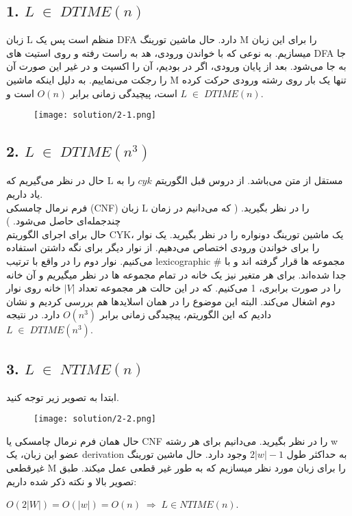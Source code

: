 \subsection*{1. $L \;\in\; DTIME(n)$}
زبان L منظم است پس یک DFA دارد.
حال ماشین تورینگ M را برای این زبان میسازیم.
به نوعی که با خواندن ورودی،
هد به راست رفته و روی استیت های DFA جا به جا می‌شود.
بعد از پایان ورودی، اگر در
بودیم، آن را اکسپت و در غیر این صورت آن را رجکت می‌نماییم.
به دلیل اینکه ماشین M تنها یک بار روی رشته ورودی حرکت کرده است، پیچیدگی زمانی برابر 
$O(n)$ است و 
$L\;\in\;DTIME(n)$.

\begin{figure}[H]
    \centering
    \texttt{[image: solution/2-1.png]}
\end{figure}

\subsection*{2. $L \;\in\; DTIME(n^3)$}
حال در نظر می‌گیریم که L مستقل از متن می‌باشد.
از دروس قبل الگوریتم $cyk$ را به یاد داریم.\\
فرم نرمال چامسکی 
(CNF)
زبان L را در نظر بگیرید.
( که می‌دانیم در زمان چندجمله‌ای حاصل می‌شود. )
\\
حال برای اجرای الگوریتم CYK،
یک ماشین تورینگ دونواره را در نظر بگیرید.
یک نوار را برای خواندن ورودی اختصاص می‌دهیم.
از نوار دیگر برای نگه داشتن 
استفاده می‌کنیم.
نوار دوم را در واقع با ترتیب 
lexicographic 
مجموعه ها قرار گرفته اند و با $\#$
جدا شده‌اند.
برای هر متغیر نیز یک خانه در تمام مجموعه ها در نظر میگیریم و آن خانه را در صورت برابری، 1 می‌کنیم.
که در این حالت هر مجموعه تعداد
$|V|$ خانه 
روی نوار دوم اشغال می‌کند.
البته این موضوع را در همان اسلایدها هم بررسی کردیم و نشان دادیم که این الگوریتم، پیچیدگی زمانی برابر 
$O(n^3)$
دارد. در نتیجه 
$L \;\in\; DTIME(n^3)$.

\subsection*{3. $L \;\in\; NTIME(n)$}
ابتدا به تصویر زیر توجه کنید.
\begin{figure}[H]
    \centering
    \texttt{[image: solution/2-2.png]}
\end{figure}

حال همان فرم نرمال چامسکی یا CNF را در نظر بگیرید.
می‌دانیم برای هر رشته w عضو این زبان،
یک derivation به حداکثر طول
$2|w| - 1$ وجود دارد.
حال ماشین تورینگ غیرقطعی M را برای زبان مورد نظر میسازیم که به طور غیر قطعی عمل میکند.
طبق تصویر بالا و نکته ذکر شده داریم:
\begin{center}
    $O(2|W|) = O(|w|) = O(n) \; \Longrightarrow \; L \in NTIME(n)$.
\end{center}